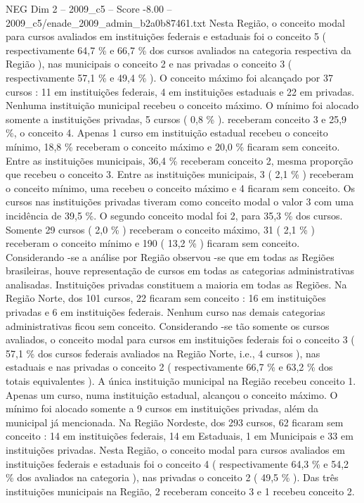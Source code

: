 \begin{textsample}{NEG Dim 2 – 2009\_c5 – Score -8.00 – 2009\_c5/enade\_2009\_admin\_b2a0b87461.txt}
Nesta Região, o conceito modal para cursos avaliados em instituições federais e estaduais foi o conceito 5 ( respectivamente 64,7 \% e 66,7 \% dos cursos avaliados na categoria respectiva da Região ), nas municipais o conceito 2 e nas privadas o conceito 3 ( respectivamente 57,1 \% e 49,4 \% ).
O conceito máximo foi alcançado por 37 cursos : 11 em instituições federais, 4 em instituições estaduais e 22 em privadas.
Nenhuma instituição municipal recebeu o conceito máximo.
O mínimo foi alocado somente a instituições privadas, 5 cursos ( 0,8 \% ). receberam conceito 3 e 25,9 \%, o conceito 4.
Apenas 1 curso em instituição estadual recebeu o conceito mínimo, 18,8 \% receberam o conceito máximo e 20,0 \% ficaram sem conceito.
Entre as instituições municipais, 36,4 \% receberam conceito 2, mesma proporção que recebeu o conceito 3.
Entre as instituições municipais, 3 ( 2,1 \% ) receberam o conceito mínimo, uma recebeu o conceito máximo e 4 ficaram sem conceito.
Os cursos nas instituições privadas tiveram como conceito modal o valor 3 com uma incidência de 39,5 \%.
O segundo conceito modal foi 2, para 35,3 \% dos cursos.
Somente 29 cursos ( 2,0 \% ) receberam o conceito máximo, 31 ( 2,1 \% ) receberam o conceito mínimo e 190 ( 13,2 \% ) ficaram sem conceito.
Considerando -se a análise por Região observou -se que em todas as Regiões brasileiras, houve representação de cursos em todas as categorias administrativas analisadas.
Instituições privadas constituem a maioria em todas as Regiões.
Na Região Norte, dos 101 cursos, 22 ficaram sem conceito : 16 em instituições privadas e 6 em instituições federais.
Nenhum curso nas demais categorias administrativas ficou sem conceito.
Considerando -se tão somente os cursos avaliados, o conceito modal para cursos em instituições federais foi o conceito 3 ( 57,1 \% dos cursos federais avaliados na Região Norte, i.e., 4 cursos ), nas estaduais e nas privadas o conceito 2 ( respectivamente 66,7 \% e 63,2 \% dos totais equivalentes ).
A única instituição municipal na Região recebeu conceito 1.
Apenas um curso, numa instituição estadual, alcançou o conceito máximo.
O mínimo foi alocado somente a 9 cursos em instituições privadas, além da municipal já mencionada.
Na Região Nordeste, dos 293 cursos, 62 ficaram sem conceito : 14 em instituições federais, 14 em Estaduais, 1 em Municipais e 33 em instituições privadas.
Nesta Região, o conceito modal para cursos avaliados em instituições federais e estaduais foi o conceito 4 ( respectivamente 64,3 \% e 54,2 \% dos avaliados na categoria ), nas privadas o conceito 2 ( 49,5 \% ).
Das três instituições municipais na Região, 2 receberam conceito 3 e 1 recebeu conceito 2.

\end{textsample}
